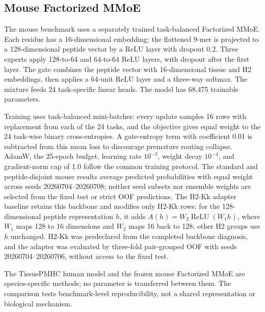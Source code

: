 \subsection{Mouse Factorized MMoE}

The mouse benchmark uses a separately trained task-balanced Factorized MMoE. Each residue has a 16-dimensional embedding; the flattened 9-mer is projected to a 128-dimensional peptide vector by a ReLU layer with dropout 0.2. Three experts apply 128-to-64 and 64-to-64 ReLU layers, with dropout after the first layer. The gate combines the peptide vector with 16-dimensional tissue and H2 embeddings, then applies a 64-unit ReLU layer and a three-way softmax. The mixture feeds 24 task-specific linear heads. The model has 68,475 trainable parameters.

Training uses task-balanced mini-batches: every update samples 16 rows with replacement from each of the 24 tasks, and the objective gives equal weight to the 24 task-wise binary cross-entropies. A gate-entropy term with coefficient 0.01 is subtracted from this mean loss to discourage premature routing collapse. AdamW, the 25-epoch budget, learning rate \(10^{-3}\), weight decay \(10^{-4}\), and gradient-norm cap of 1.0 follow the common training protocol. The standard and peptide-disjoint mouse results average predicted probabilities with equal weight across seeds 20260704--20260708; neither seed subsets nor ensemble weights are selected from the fixed test or strict OOF predictions. The H2-Kk adapter baseline retains this backbone and modifies only H2-Kk rows: for the 128-dimensional peptide representation \(h\), it adds \(A(h)=W_2\operatorname{ReLU}(W_1h)\), where \(W_1\) maps 128 to 16 dimensions and \(W_2\) maps 16 back to 128; other H2 groups use \(h\) unchanged. H2-Kk was predeclared from the completed backbone diagnosis, and the adapter was evaluated by three-fold pair-grouped OOF with seeds 20260704--20260706, without access to the fixed test.

The TissuePMHC human model and the frozen mouse Factorized MMoE are species-specific methods; no parameter is transferred between them. The comparison tests benchmark-level reproducibility, not a shared representation or biological mechanism.
